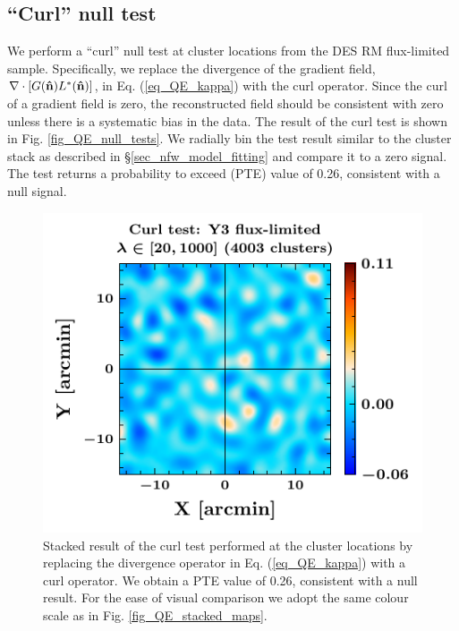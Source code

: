 \subsection{``Curl'' null test}\label{sec_null_tests}

We perform a ``curl'' null test \citep{hu07} at \howmanyclustersinfullsample{} cluster locations from the DES RM \whichyear{} flux-limited sample.
Specifically, we replace the divergence of the gradient field, $\nabla \cdot [G(\bm{\hat{\mbox{n}}}) L^{*}(\bm{\hat{\mbox{n}}})]$, in Eq. (\ref{eq_QE_kappa}) with the curl operator. 
Since the curl of a gradient field is zero, the reconstructed field should be consistent with zero unless there is a systematic bias in the data. 
The result of the curl test is shown in Fig. \ref{fig_QE_null_tests}. 
We radially bin the test result similar to the cluster stack as described in \S\ref{sec_nfw_model_fitting} and compare it to a zero signal.
The test returns a probability to exceed (PTE) value of 0.26, consistent with a null signal.

\begin{figure}[ht]
\includegraphics[width=\linewidth]{figs/kappa_model_MF_y3_v6_4_22_full_curl_test_JODY.pdf}
\caption{Stacked result of the curl test performed at the cluster locations by replacing the divergence operator in Eq. (\ref{eq_QE_kappa}) with a curl operator. %
We obtain a PTE value of 0.26, consistent with a null result.
For the ease of visual comparison we adopt the same colour scale as in Fig. \ref{fig_QE_stacked_maps}.
}
\end{figure}
